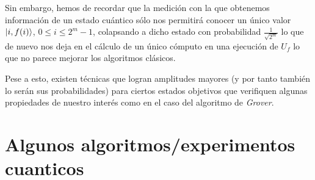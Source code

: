 Sin embargo, hemos de recordar que la medición con la que obtenemos información de un estado cuántico sólo nos permitirá conocer un único valor $\left|i,f(i)\right\rangle$, $0\leq i\leq 2^m-1$, colapsando a dicho estado con probabilidad $\frac{1}{\sqrt{2^m}}$ lo que de nuevo nos deja en el cálculo de un único cómputo en una ejecución de $U_f$ lo que no parece mejorar los algoritmos clásicos.

Pese a esto, existen técnicas que logran amplitudes mayores (y por tanto también lo serán sus probabilidades) para ciertos estados objetivos que verifiquen algunas propiedades de nuestro interés como en el caso del algoritmo de \textit{Grover}. %


\section{Algunos algoritmos/experimentos cuanticos}